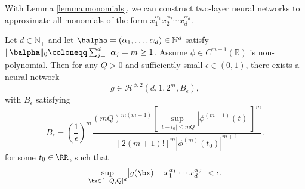 \documentclass[11pt]{article}
\begin{document}
With Lemma \ref{lemma:monomials}, we can construct two-layer neural networks to approximate all monomials of the form $x_1^{\alpha_1} x_2^{\alpha_2} \cdots x_d^{\alpha_d}$. 
\begin{lemma}\label{lemma:all_monomials}
    Let $d \in \mathbb{N}_{+}$ and let $\balpha = (\alpha_1, \ldots, \alpha_d) \in \mathbb{N}^d$ satisfy
    $\|\balpha\|_0 \coloneqq  \sum_{j=1}^{d} \alpha_j = m \ge 1$.
    Assume $\phi \in C^{m+1}(\mathbb{R})$ is non-polynomial. Then for any $Q>0$ and 
    sufficiently small $\epsilon \in (0,1)$, there exists a neural network
    \begin{equation*}
        g \in \mathcal{H}^{\phi,2}(d, 1, 2^m , B_{\epsilon}),
    \end{equation*}
    with  $B_{\epsilon}$ satisfying
    \begin{equation}
        B_{\epsilon} = \left( \frac{1}{\epsilon}\right)^m  \frac{(mQ)^{m(m+1)} \left[\sup_{|t-t_0| \leq m Q} |\phi^{(m+1)}(t)| \right]^{m}}{ [2(m+1)!]^m |\phi^{(m)}(t_0)|^{m+1}}.
        \label{eq:B_eps_1}
    \end{equation}
    for some $t_0\in\RR$, such that
    \begin{equation*}
         \sup_{\bx\in[-Q,Q]^d}
    \bigl|g(\bx)-x_1^{\alpha_1}\cdots x_d^{\alpha_d}\bigr|<\epsilon .
    \end{equation*}
\end{lemma}
\end{document}
